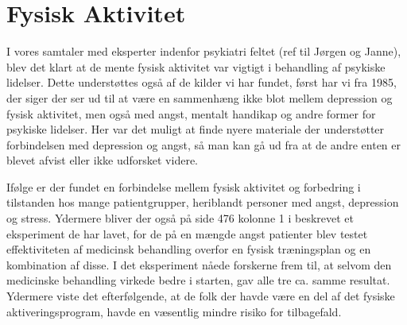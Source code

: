 \section{Fysisk Aktivitet}
I vores samtaler med eksperter indenfor psykiatri feltet (ref til Jørgen og Janne), blev det klart at de mente fysisk aktivitet var vigtigt i behandling af psykiske lidelser.
Dette understøttes også af de kilder vi har fundet, først har vi \citet{misc:healthReports} fra 1985, der siger der ser ud til at være en sammenhæng ikke blot mellem depression og fysisk aktivitet, men også med angst, mentalt handikap og andre former for psykiske lidelser.
Her var det muligt at finde nyere materiale der understøtter forbindelsen med depression og angst, så man kan gå ud fra at de andre enten er blevet afvist eller ikke udforsket videre.

Ifølge \citet{book:sportPsyc} er der fundet en forbindelse mellem fysisk aktivitet og forbedring i tilstanden hos mange patientgrupper, heriblandt personer med angst, depression og stress.
Ydermere bliver der også på side 476 kolonne 1 i \citet{book:sportPsyc} beskrevet et eksperiment de har lavet, for de på en mængde angst patienter blev testet effektiviteten af medicinsk behandling overfor en fysisk træningsplan og en kombination af disse.
I det eksperiment nåede forskerne frem til, at selvom den medicinske behandling virkede bedre i starten, gav alle tre ca. samme resultat.
Ydermere viste det efterfølgende, at de folk der havde være en del af det fysiske aktiveringsprogram, havde en væsentlig mindre risiko for tilbagefald.
